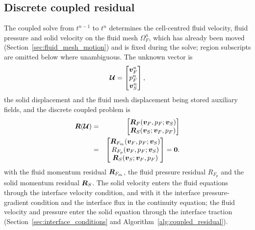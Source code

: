 \subsection{Discrete coupled residual}
\label{sec:discrete_coupled_residual}

The coupled solve from $t^{n-1}$ to $t^n$ determines the cell-centred fluid velocity, fluid pressure and solid velocity on the fluid mesh $\Omega_F^n$, which has already been moved (Section~\ref{sec:fluid_mesh_motion}) and is fixed during the solve; region subscripts are omitted below where unambiguous. The unknown vector is
\begin{equation}
    \boldsymbol{\mathcal{U}}
    =
    \begin{bmatrix}
    \boldsymbol{v}_F^n \\
    p_F^n \\
    \boldsymbol{v}_S^n
    \end{bmatrix},
    \label{eqn:coupled_unknown_vector}
\end{equation}
the solid displacement and the fluid mesh displacement being stored auxiliary fields, and the discrete coupled problem is
\begin{eqnarray}
    \boldsymbol{R}(\boldsymbol{\mathcal{U}})
    &=&
    \begin{bmatrix}
    \boldsymbol{R}_F(\boldsymbol{v}_F,p_F;\boldsymbol{v}_S) \\
    \boldsymbol{R}_S(\boldsymbol{v}_S;\boldsymbol{v}_F,p_F)
    \end{bmatrix} \label{eqn:grouped_coupled_residual} \\
    &=&
    \begin{bmatrix}
    \boldsymbol{R}_{F_m}(\boldsymbol{v}_F,p_F;\boldsymbol{v}_S) \\
    R_{F_p}(\boldsymbol{v}_F,p_F;\boldsymbol{v}_S) \\
    \boldsymbol{R}_S(\boldsymbol{v}_S;\boldsymbol{v}_F,p_F)
    \end{bmatrix}
    =
    \boldsymbol{0}.
    \label{eqn:coupled_residual}
\end{eqnarray}
with the fluid momentum residual $\boldsymbol{R}_{F_m}$, the fluid pressure residual $R_{F_p}$ and the solid momentum residual $\boldsymbol{R}_S$.
The solid velocity enters the fluid equations through the interface velocity condition, and with it the interface pressure-gradient condition and the interface flux in the continuity equation; the fluid velocity and pressure enter the solid equation through the interface traction (Section~\ref{sec:interface_conditions} and Algorithm~\ref{alg:coupled_residual}).
